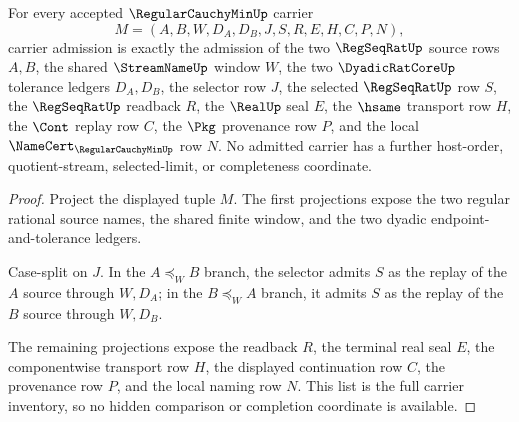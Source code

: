 \begin{theorem}
\label{thm:regular-cauchy-min-obligation-carrier-admission}
For every accepted $\RegularCauchyMinUp$ carrier
$$
M=(A,B,W,D_A,D_B,J,S,R,E,H,C,P,N),
$$
carrier admission is exactly the admission of the two $\RegSeqRatUp$ source rows $A,B$, the shared $\StreamNameUp$ window $W$, the two $\DyadicRatCoreUp$ tolerance ledgers $D_A,D_B$, the selector row $J$, the selected $\RegSeqRatUp$ row $S$, the $\RegSeqRatUp$ readback $R$, the $\RealUp$ seal $E$, the $\hsame$ transport row $H$, the $\Cont$ replay row $C$, the $\Pkg$ provenance row $P$, and the local $\NameCert_{\RegularCauchyMinUp}$ row $N$. No admitted carrier has a further host-order, quotient-stream, selected-limit, or completeness coordinate.
\end{theorem}
\begin{proof}
Project the displayed tuple $M$. The first projections expose the two regular rational source names, the shared finite window, and the two dyadic endpoint-and-tolerance ledgers.

Case-split on $J$. In the $A \preceq_W B$ branch, the selector admits $S$ as the replay of the $A$ source through $W,D_A$; in the $B \preceq_W A$ branch, it admits $S$ as the replay of the $B$ source through $W,D_B$.

The remaining projections expose the readback $R$, the terminal real seal $E$, the componentwise transport row $H$, the displayed continuation row $C$, the provenance row $P$, and the local naming row $N$. This list is the full carrier inventory, so no hidden comparison or completion coordinate is available.
\end{proof}

